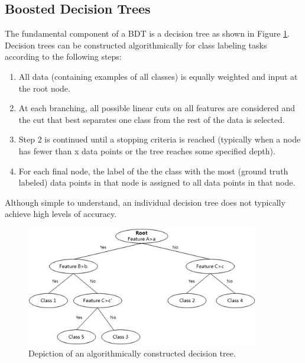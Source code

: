 \subsection{Boosted Decision Trees}
The fundamental component of a BDT is a decision tree as shown in Figure \ref{fig:dt_diag}. Decision trees can be constructed algorithmically for class labeling tasks according to the following steps:
\begin{enumerate}
    \item All data (containing examples of all classes) is equally weighted and input at the root node.
    \item At each branching, all possible linear cuts on all features are considered and the cut that best separates one class from the rest of the data is selected.
    \item Step 2 is continued until a stopping criteria is reached (typically when a node has fewer than x data points or the tree reaches some specified depth).
    \item For each final node, the label of the the class with the most (ground truth labeled) data points in that node is assigned to all data points in that node.
\end{enumerate}
\noindent Although simple to understand, an individual decision tree does not typically achieve high levels of accuracy.\\

\begin{figure}[htb!]
    \centering
    \includegraphics[width=4in]{figures/chapter4/dt_diag.jpg}
    \caption{Depiction of an algorithmically constructed decision tree.}
    \label{fig:dt_diag}
\end{figure}

